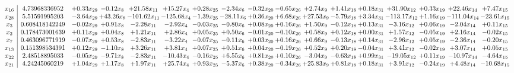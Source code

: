 \documentclass[9pt]{article}
\begin{document}
\[\begin{array}{c| c c@{\hskip 2pt} c@{\hskip 2pt} c@{\hskip 2pt} c@{\hskip 2pt} c@{\hskip 2pt} c@{\hskip 2pt} c@{\hskip 2pt} c@{\hskip 2pt} c@{\hskip 2pt} c@{\hskip 2pt} c@{\hskip 2pt} c@{\hskip 2pt} c@{\hskip 2pt} c@{\hskip 2pt} c@{\hskip 2pt} }
 x_{16}   &  4.73968336952 & +  0.33 x_{29} & -0.12 x_{8} & + 21.58 x_{11} & + 15.27 x_{4} & +  0.28 x_{25} & -2.34 x_{6} & -0.32 x_{20} & -0.65 x_{26} & +  2.74 x_{9} & +  1.41 x_{18} & +  0.18 x_{31} & + 31.90 x_{12} & +  0.33 x_{19} & + 22.46 x_{14} & +  7.47 x_{15}\\
 x_{28}   &  5.51591995203 & -3.64 x_{29} & + 43.26 x_{8} & -101.62 x_{11} & -125.68 x_{4} & -1.39 x_{25} & -28.11 x_{6} & +  0.36 x_{20} & +  6.68 x_{26} & + 27.53 x_{9} & -5.79 x_{18} & +  3.34 x_{31} & -113.17 x_{12} & +  1.16 x_{19} & -111.04 x_{14} & -23.61 x_{15}\\
 x_{3}   &  0.608418142249 & -0.02 x_{29} & +  0.91 x_{8} & -2.28 x_{11} & -2.92 x_{4} & -0.03 x_{25} & -0.80 x_{6} & +  0.08 x_{20} & +  0.16 x_{26} & +  1.50 x_{9} & -0.12 x_{18} & +  0.13 x_{31} & -3.16 x_{12} & +  0.06 x_{19} & -2.04 x_{14} & +  0.11 x_{15}\\
 x_{2}   &  0.178473001639 & +  0.11 x_{29} & +  0.04 x_{8} & +  1.21 x_{11} & +  2.86 x_{4} & +  0.05 x_{25} & +  0.50 x_{6} & -0.01 x_{20} & -0.10 x_{26} & +  0.58 x_{9} & +  0.12 x_{18} & +  0.00 x_{31} & +  1.57 x_{12} & -0.05 x_{19} & +  2.16 x_{14} & -0.02 x_{15}\\
 x_{7}   &  0.463096771919 & -0.07 x_{29} & +  0.53 x_{8} & -2.83 x_{11} & -3.22 x_{4} & -0.07 x_{25} & -0.11 x_{6} & +  0.03 x_{20} & +  0.16 x_{26} & +  0.66 x_{9} & -0.13 x_{18} & +  0.14 x_{31} & -2.96 x_{12} & +  0.05 x_{19} & -2.36 x_{14} & -0.20 x_{15}\\
 x_{13}   &  0.151398534391 & +  0.12 x_{29} & -1.10 x_{8} & +  3.26 x_{11} & +  3.81 x_{4} & +  0.07 x_{25} & +  0.51 x_{6} & +  0.04 x_{20} & -0.19 x_{26} & +  0.52 x_{9} & +  0.20 x_{18} & -0.04 x_{31} & +  3.41 x_{12} & -0.02 x_{19} & +  3.07 x_{14} & +  0.05 x_{15}\\
 x_{22}   &  2.48518895033 & -0.05 x_{29} & -9.71 x_{8} & -2.83 x_{11} & -10.43 x_{4} & -0.16 x_{25} & +  6.55 x_{6} & +  0.81 x_{20} & +  0.10 x_{26} & -3.04 x_{9} & -0.63 x_{18} & +  0.99 x_{31} & -19.05 x_{12} & +  0.11 x_{19} & -10.97 x_{14} & -4.64 x_{15}\\
 x_{21}   &  4.24245060219 & +  1.04 x_{29} & +  1.17 x_{8} & +  1.97 x_{11} & + 25.74 x_{4} & +  0.93 x_{25} & -5.37 x_{6} & +  0.38 x_{20} & -0.34 x_{26} & + 25.83 x_{9} & +  0.81 x_{18} & +  0.18 x_{31} & +  3.91 x_{12} & -0.24 x_{19} & +  4.48 x_{14} & -10.68 x_{15}\\

\end{array}\]
\end{document}
